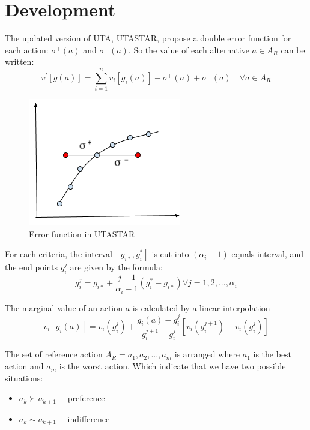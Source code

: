 \documentclass{report}
\begin{document}
\newpage
\section{Development} 
The updated version of UTA, UTASTAR, propose a double error function for each action: $\sigma ^{+} (a)$ and $\sigma ^{-} (a)$.  So the value of each alternative $a \in A_R$ can be written: \\
\begin{equation}
	v^{'} [g(a)] = \sum_{i=1}^{n} v_i [g_i (a)] - \sigma ^{+} (a)+ \sigma ^{-} (a) \quad  \forall a \in A_R
\end{equation}
\begin{figure}[H]
    	\centering
	\includegraphics{error-function-utastar}
	\caption{Error function in UTASTAR}
\end{figure}
For each criteria, the interval $[g_{i*}, g_i^{*}]$ is cut into $(\alpha _i -1)$ equals interval, and the end points $g_i^{j}$ are given by the formula:
\begin{equation}
	g_i^{j}= g_{i*} + \frac{j-1}{\alpha _i -1} (g_i^{*} - g_{i*})  \forall j = 1,2, ..., \alpha _i
\end{equation}

The marginal value of an action $a$ is calculated by a linear interpolation
\begin{equation}
	v_i [g_i (a)] = v_i (g_i^{j}) + \frac{g_i (a) - g_i^{j}}{ g_i^{j+1} - g_i^{j}} [v_i (g_i^{j+1}) - v_i (g_i^{j}) ] 
\end{equation}

The set of reference action $ A_R = a_1, a_2, ... , a_m$ is arranged where $a_1$ is the best action and $a_m$ is the worst action. Which indicate that we have two possible situations:
\begin{itemize}
\item $a_k  \succ a_{k+1} \quad $ preference 
\item $a_k \sim a_{k+1} \quad $ indifference
\end{itemize} 
\end{document}
